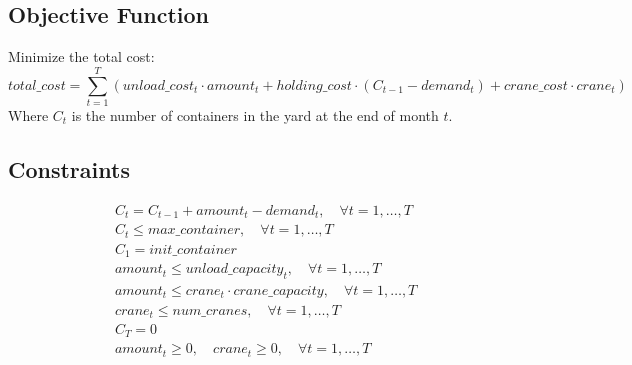 \documentclass{article}
\begin{document}
\subsection*{Objective Function}
Minimize the total cost:
\[
total\_cost = \sum_{t=1}^{T} (unload\_cost_{t} \cdot amount_{t} + holding\_cost \cdot (C_{t-1} - demand_{t}) + crane\_cost \cdot crane_{t})
\]
Where \( C_{t} \) is the number of containers in the yard at the end of month \( t \).

\subsection*{Constraints}
\begin{align}
    & C_{t} = C_{t-1} + amount_{t} - demand_{t}, \quad \forall t = 1, \ldots, T \\
    & C_{t} \leq max\_container, \quad \forall t = 1, \ldots, T \\
    & C_{1} = init\_container \\
    & amount_{t} \leq unload\_capacity_{t}, \quad \forall t = 1, \ldots, T \\
    & amount_{t} \leq crane_{t} \cdot crane\_capacity, \quad \forall t = 1, \ldots, T \\
    & crane_{t} \leq num\_cranes, \quad \forall t = 1, \ldots, T \\
    & C_{T} = 0 \\
    & amount_{t} \geq 0, \quad crane_{t} \geq 0, \quad \forall t = 1, \ldots, T
\end{align}
\end{document}
